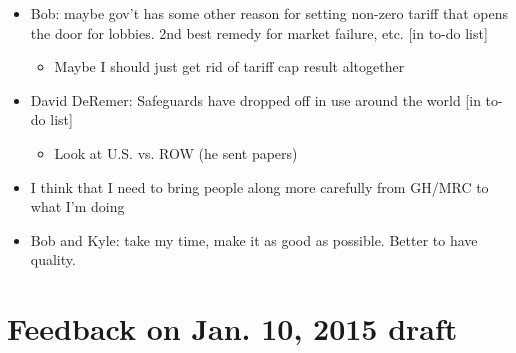 \documentclass[12pt]{article}
\begin{document}
\begin{itemize}
\begin{itemize}
		\end{itemize}
	\item Bob: maybe gov't has some other reason for setting non-zero tariff that opens the door for lobbies. 2nd best remedy for market failure, etc. [in to-do list]
		\begin{itemize}
			\item Maybe I should just get rid of tariff cap result altogether
		\end{itemize}
	\item David DeRemer: Safeguards have dropped off in use around the world [in to-do list]
		\begin{itemize}
			\item Look at U.S. vs. ROW (he sent papers)
		\end{itemize}
	\item I think that I need to bring people along more carefully from GH/MRC to what I'm doing
	\item Bob and Kyle: take my time, make it as good as possible. Better to have quality.
\end{itemize}


\newpage
\section{Feedback on Jan. 10, 2015 draft}
\end{document}
